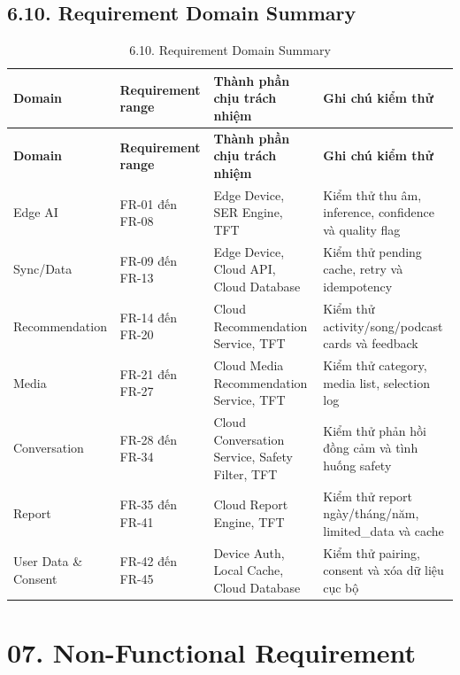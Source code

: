 \documentclass[12pt,a4paper]{article}
\begin{document}
\subsection*{6.10. Requirement Domain Summary}

\begin{center}
\scriptsize
\begin{longtable}{|P{0.18\textwidth}|P{0.25\textwidth}|P{0.25\textwidth}|P{0.22\textwidth}|}
\caption{6.10. Requirement Domain Summary}\\
\hline
\textbf{Domain} & \textbf{Requirement range} & \textbf{Thành phần chịu trách nhiệm} & \textbf{Ghi chú kiểm thử} \\
\hline
\endfirsthead
\hline
\textbf{Domain} & \textbf{Requirement range} & \textbf{Thành phần chịu trách nhiệm} & \textbf{Ghi chú kiểm thử} \\
\hline
\endhead
Edge AI & FR-01 đến FR-08 & Edge Device, SER Engine, TFT & Kiểm thử thu âm, inference, confidence và quality flag \\
\hline
Sync/Data & FR-09 đến FR-13 & Edge Device, Cloud API, Cloud Database & Kiểm thử pending cache, retry và idempotency \\
\hline
Recommendation & FR-14 đến FR-20 & Cloud Recommendation Service, TFT & Kiểm thử activity/song/podcast cards và feedback \\
\hline
Media & FR-21 đến FR-27 & Cloud Media Recommendation Service, TFT & Kiểm thử category, media list, selection log \\
\hline
Conversation & FR-28 đến FR-34 & Cloud Conversation Service, Safety Filter, TFT & Kiểm thử phản hồi đồng cảm và tình huống safety \\
\hline
Report & FR-35 đến FR-41 & Cloud Report Engine, TFT & Kiểm thử report ngày/tháng/năm, limited\_data và cache \\
\hline
User Data \& Consent & FR-42 đến FR-45 & Device Auth, Local Cache, Cloud Database & Kiểm thử pairing, consent và xóa dữ liệu cục bộ \\
\hline
\end{longtable}
\normalsize
\end{center}

\FloatBarrier

\clearpage
\section*{07. Non-Functional Requirement}
\end{document}
